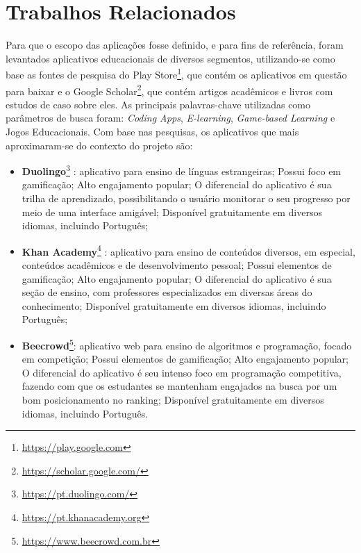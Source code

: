 \section{Trabalhos Relacionados}
Para que o escopo das aplicações fosse definido, e para fins de referência, foram levantados aplicativos educacionais de diversos segmentos, utilizando-se como base as fontes de pesquisa do Play Store\footnote{\url{https://play.google.com}}, que contém os aplicativos em questão para baixar e o Google Scholar\footnote{\url{https://scholar.google.com/}}, que contém artigos acadêmicos e livros com estudos de caso sobre eles. As principais palavras-chave utilizadas como parâmetros de busca foram: \textit{Coding Apps}, \textit{E-learning}, \textit{Game-based Learning} e Jogos Educacionais. Com base nas pesquisas, os aplicativos que mais aproximaram-se do contexto do projeto são:

\begin{itemize}
  \item \textbf{Duolingo}\footnote{\url{https://pt.duolingo.com/}} \cite{duolingo}: aplicativo para ensino de línguas estrangeiras; Possui foco em gamificação; Alto engajamento popular; O diferencial do aplicativo é sua trilha de aprendizado, possibilitando o usuário monitorar o seu progresso por meio de uma interface amigável; Disponível gratuitamente em diversos idiomas, incluindo Português;
  \item \textbf{Khan Academy}\footnote{\url{https://pt.khanacademy.org}} \cite{khan_academy}: aplicativo para ensino de conteúdos diversos, em especial, conteúdos acadêmicos e de desenvolvimento pessoal; Possui elementos de gamificação; Alto engajamento popular; O diferencial do aplicativo é sua seção de ensino, com professores especializados em diversas áreas do conhecimento; Disponível gratuitamente em diversos idiomas, incluindo Português;
  \item \textbf{Beecrowd}\footnote{\url{https://www.beecrowd.com.br}}: aplicativo web para ensino de algoritmos e programação, focado em competição; Possui elementos de gamificação; Alto engajamento popular; O diferencial do aplicativo é seu intenso foco em programação competitiva, fazendo com que os estudantes se mantenham engajados na busca por um bom posicionamento no ranking; Disponível gratuitamente em diversos idiomas, incluindo Português.
\end{itemize}

